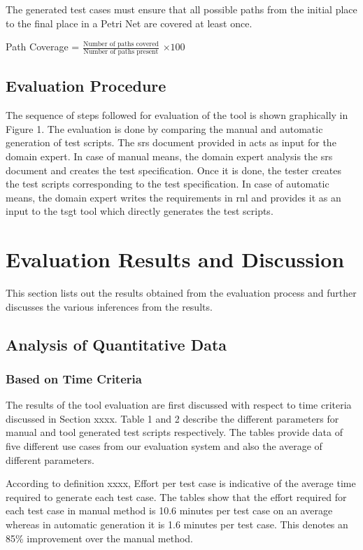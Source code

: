 \begin{definition}
\label{def:def8}

The generated test cases must ensure that all possible paths from the initial place to the final place in a Petri Net are covered at least once.

Path Coverage = $\displaystyle\frac{\mbox{Number of paths covered}}{\mbox{Number of paths present}}$  $\times 100$
\end{definition}

\subsection{Evaluation Procedure}
The sequence of steps followed for evaluation of the tool is shown graphically in Figure 1. The evaluation is done by comparing the manual and automatic generation of test scripts. The \gls{srs} document provided in \cite{blazysoftware} acts as input for the domain expert. In case of manual means, the domain expert analysis the \gls{srs} document and creates the test specification. Once it is done, the tester creates the test scripts corresponding to the test specification. In case of automatic means, the domain expert writes the requirements in \gls{rnl} and provides it as an input to the \gls{tsgt} tool which directly generates the test scripts.
\section{Evaluation Results and Discussion}
This section lists out the results obtained from the evaluation process and further discusses the various inferences from the results.
\subsection{Analysis of Quantitative Data}
\subsubsection{Based on Time Criteria}
The results of the tool evaluation are first discussed with respect to time criteria discussed in Section xxxx. Table 1 and 2 describe the different parameters for manual and tool generated test scripts respectively. The tables provide data of five different use cases from our evaluation system and also the average of different parameters.

According to definition xxxx, Effort per test case is indicative of the average time required to generate each test case. The tables show that the effort required for each test case in manual method is 10.6 minutes per test case on an average whereas in automatic generation it is 1.6 minutes per test case. This denotes an 85\% improvement over the manual method.

